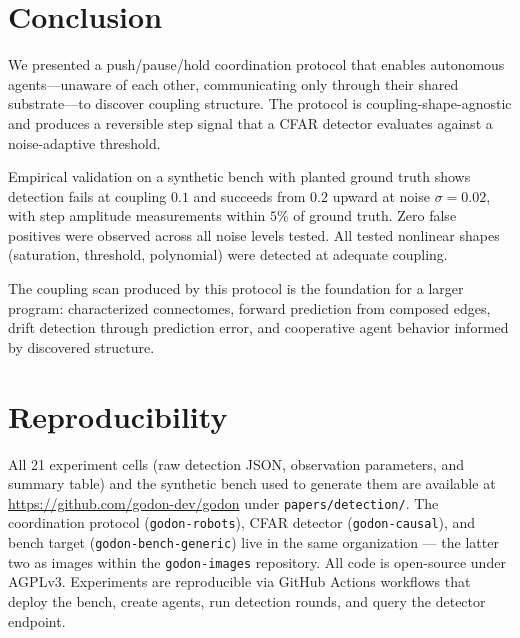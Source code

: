 \section{Conclusion}
\label{sec:conclusion}

We presented a push/pause/hold coordination protocol that enables
autonomous agents---unaware of each other, communicating only through
their shared substrate---to discover coupling structure. The protocol
is coupling-shape-agnostic and produces a reversible step signal that
a CFAR detector evaluates against a noise-adaptive threshold.

Empirical validation on a synthetic bench with planted ground truth
shows detection fails at coupling $0.1$ and succeeds from $0.2$
upward at noise $\sigma = 0.02$, with step amplitude measurements within $5\%$ of ground truth.
Zero false positives were observed across all noise levels tested.
All tested nonlinear shapes (saturation, threshold, polynomial) were
detected at adequate coupling.

The coupling scan produced by this protocol is the foundation for a
larger program: characterized connectomes, forward prediction from
composed edges, drift detection through prediction error, and
cooperative agent behavior informed by discovered structure.

\section*{Reproducibility}

All 21 experiment cells (raw detection JSON, observation parameters,
and summary table) and the synthetic bench used to generate them are
available at \url{https://github.com/godon-dev/godon} under
\texttt{papers/detection/}. The coordination protocol
(\texttt{godon-robots}), CFAR detector (\texttt{godon-causal}), and
bench target (\texttt{godon-bench-generic}) live in the same
organization --- the latter two as images within the
\texttt{godon-images} repository. All code is open-source
under AGPLv3. Experiments are reproducible via GitHub Actions
workflows that deploy the bench, create agents, run detection rounds,
and query the detector endpoint.
